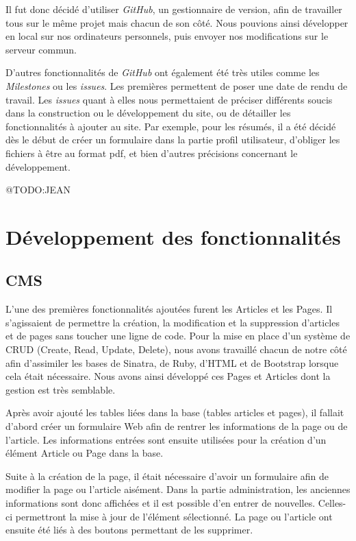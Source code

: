 \documentclass[a4paper,11pt]{article}
\begin{document}
\bigbreak
Il fut donc décidé d'utiliser \textit{GitHub}, un gestionnaire de version, afin de travailler tous sur le même projet mais chacun de son côté. Nous pouvions ainsi développer en local sur nos ordinateurs personnels, puis envoyer nos modifications sur le serveur commun.

D'autres fonctionnalités de \textit{GitHub} ont également été très utiles comme les \textit{Milestones} ou les \textit{issues}. Les premières permettent de poser une date de rendu de travail. Les \textit{issues} quant à elles nous permettaient de préciser différents soucis dans la construction ou le développement du site, ou de détailler les fonctionnalités à ajouter au site. Par exemple, pour les résumés, il a été décidé dès le début de créer un formulaire dans la partie profil utilisateur, d'obliger les fichiers à être au format pdf, et bien d'autres précisions concernant le développement.

@TODO:JEAN

\section{Développement des fonctionnalités}

\subsection{CMS}
L'une des premières fonctionnalités ajoutées furent les Articles et les Pages. Il s'agissaient de permettre la création, la modification et la suppression d'articles et de pages sans toucher une ligne de code. Pour la mise en place d'un système de CRUD (Create, Read, Update, Delete), nous avons travaillé chacun de notre côté afin d'assimiler les bases de Sinatra, de Ruby, d'HTML et de Bootstrap lorsque cela était nécessaire. Nous avons ainsi développé ces Pages et Articles dont la gestion est très semblable.

Après avoir ajouté les tables liées dans la base (tables articles et pages), il fallait d'abord créer un formulaire Web afin de rentrer les informations de la page ou de l'article. Les informations entrées sont ensuite utilisées pour la création d'un élément Article ou Page dans la base.

Suite à la création de la page, il était nécessaire d'avoir un formulaire afin de modifier la page ou l'article aisément. Dans la partie administration, les anciennes informations sont donc affichées et il est possible d'en entrer de nouvelles. Celles-ci permettront la mise à jour de l'élément sélectionné. La page ou l'article ont ensuite été liés à des boutons permettant de les supprimer. 
\end{document}
